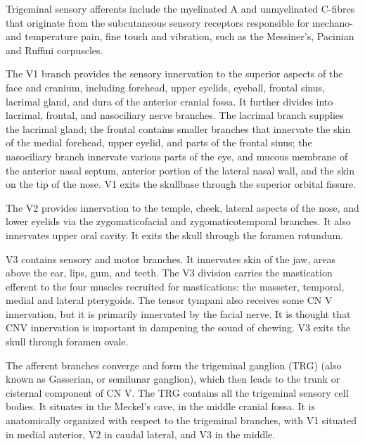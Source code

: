 Trigeminal sensory afferents include the myelinated A and unmyelinated C-fibres that originate from the subcutaneous sensory receptors responsible for mechano- and temperature pain, fine touch and vibration, such as the Messiner's, Pacinian and Ruffini corpuscles. 

The V1 branch provides the sensory innervation to the superior aspects of the face and cranium, including forehead, upper eyelids, eyeball, frontal sinus, lacrimal gland, and dura of the anterior cranial fossa. It further divides into lacrimal, frontal, and nasociliary nerve branches. The lacrimal branch supplies the lacrimal gland; the frontal contains smaller branches that innervate the skin of the medial forehead, upper eyelid, and parts of the frontal sinus; the nasociliary branch innervate various parts of the eye, and mucous membrane of the anterior nasal septum, anterior portion of the lateral nasal wall, and the skin on the tip of the nose. V1 exits the skullbase through the superior orbital fissure.  

The V2 provides innervation to the temple, cheek, lateral aspects of the nose, and lower eyelids via the zygomaticofacial and zygomaticotemporal branches. It also innervates upper oral cavity. It exits the skull through the foramen rotundum. 

V3 contains sensory and motor branches. It innervates skin of the jaw, areas above the ear, lips, gum, and teeth. The V3 division carries the mastication efferent to the four muscles recruited for mastications: the masseter, temporal, medial and lateral pterygoids. The tensor tympani also receives some CN V innervation, but it is primarily innervated by the facial nerve.  It is thought that CNV innervation is important in dampening the sound of chewing. V3 exits the skull through foramen ovale. 

The afferent branches converge and form the trigeminal ganglion (TRG) (also known as Gasserian, or semilunar ganglion), which then leads to the trunk or cisternal component of CN V. The TRG contains all the trigeminal sensory cell bodies. It situates in the Meckel's cave, in the middle cranial fossa. It is anatomically organized with respect to the trigeminal branches, with V1 situated in medial anterior, V2 in caudal lateral, and V3 in the middle.

